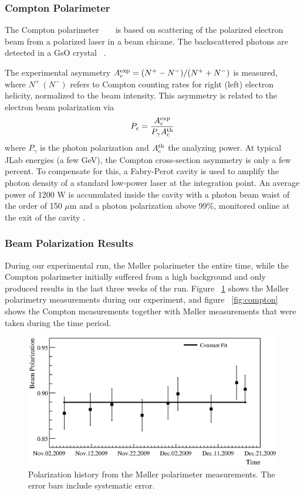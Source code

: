 \subsubsection{Compton Polarimeter}
\label{sec:cpt_exp_meth}

The Compton polarimeter ~\cite{Baylac} \cite{Neyret} ~\cite{megan}
is based on scattering of the polarized electron beam from
a polarized laser in a beam chicane.
The backscattered photons are detected in a GsO crystal ~\cite{megan}.

The experimental
asymmetry $A^{\rm exp}_c=(N^+-N^-)/(N^++N^-)$ is measured, where
$N^+\, (N^-)$ refers to Compton counting rates for right (left)
electron helicity, normalized to the beam intensity. This asymmetry is
related to the electron beam polarization via
\begin{equation}
P_e=\frac{A^{\rm exp}_c}{P_\gamma A^{\rm th}_c}
\label{eq:a_expc}
\end{equation}
where $P_\gamma$ is the photon polarization and $A^{\rm th}_c$ the analyzing
power.  At typical JLab energies (a few GeV), the Compton cross-section
asymmetry is only a few percent.
To compensate for this, a Fabry-Perot cavity
\cite{Jorda} is used to amplify the photon density of a standard
low-power laser at the integration point. An average power of 1200 W
is accumulated inside the cavity with a photon beam waist of the
order of 150 $\mu$m and a photon polarization above 99\%, monitored
online at the exit of the cavity \cite{Falletto}.


\subsubsection{Beam Polarization Results}
\label{sec:cpt_exp_meth}

During our experimental run, the M{\o}ller polarimeter the entire time,
while the Compton polarimeter initially suffered from a high background
and only produced results in the last three weeks of the run.
Figure ~\ref{fig:moller} shows the M{\o}ller polarimetry measurements during
our experiment, and figure ~\ref{fig:compton} shows the Compton measurements
together with M{\o}ller measurements that were taken during the time period.

\begin{figure}[!ht]
\centering
\includegraphics{RM/mollerpol.eps}
\caption{Polarization history from the M{\o}ller polarimeter measurements. 
The error bars include systematic error.}
\label{fig:moller}
\end{figure}


